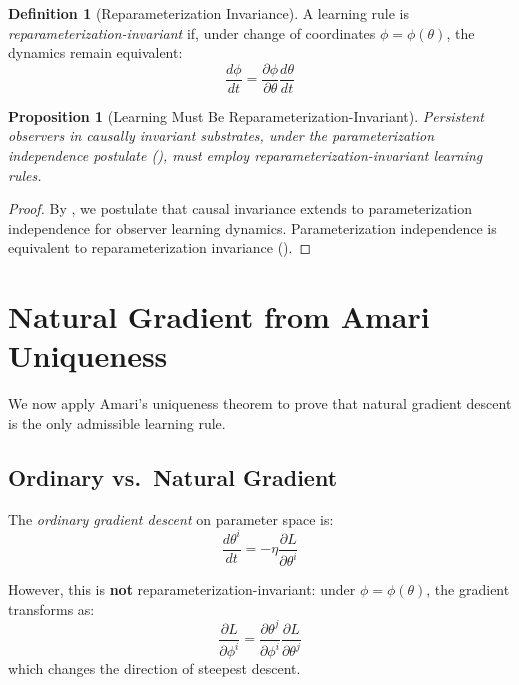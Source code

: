 \documentclass[11pt,a4paper]{article}
\theoremstyle{plain}
\newtheorem{proposition}[theorem]{Proposition}
\theoremstyle{definition}
\newtheorem{definition}[theorem]{Definition}
\theoremstyle{remark}
\newcommand{\del}{\partial}
\begin{document}
\begin{definition}[Reparameterization Invariance]
\label{def:reparam_inv}
A learning rule is \emph{reparameterization-invariant} if, under change of coordinates $\phi = \phi(\theta)$, the dynamics remain equivalent:
\begin{equation}
\frac{d\phi}{dt} = \frac{\del \phi}{\del \theta} \frac{d\theta}{dt}
\end{equation}
\end{definition}

\begin{proposition}[Learning Must Be Reparameterization-Invariant]
\label{prop:reparam_req}
Persistent observers in causally invariant substrates, under the parameterization independence postulate (), must employ reparameterization-invariant learning rules.
\end{proposition}
\begin{proof}
By , we postulate that causal invariance extends to parameterization independence for observer learning dynamics. Parameterization independence is equivalent to reparameterization invariance ().
\end{proof}


\section{Natural Gradient from Amari Uniqueness}
\label{sec:amari}

We now apply Amari's uniqueness theorem to prove that natural gradient descent is the only admissible learning rule.

\subsection{Ordinary vs.\ Natural Gradient}

The \emph{ordinary gradient descent} on parameter space is:
\begin{equation}
\frac{d\theta^i}{dt} = -\eta \frac{\del L}{\del \theta^i}
\end{equation}

However, this is \textbf{not} reparameterization-invariant: under $\phi = \phi(\theta)$, the gradient transforms as:
\begin{equation}
\frac{\del L}{\del \phi^i} = \frac{\del \theta^j}{\del \phi^i} \frac{\del L}{\del \theta^j}
\end{equation}
which changes the direction of steepest descent.
\end{document}
